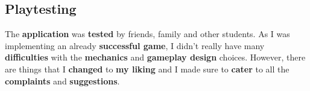 		\subsection{Playtesting}
			\par The \textbf{application} was \textbf{tested} by friends, family and other students. As I was implementing an already \textbf{successful game}, I didn't really have many \textbf{difficulties} with the \textbf{mechanics} and \textbf{gameplay design} choices. However, there are things that I \textbf{changed} to \textbf{my liking} and I made sure to \textbf{cater} to all the \textbf{complaints} and \textbf{suggestions}.
	
\newpage
